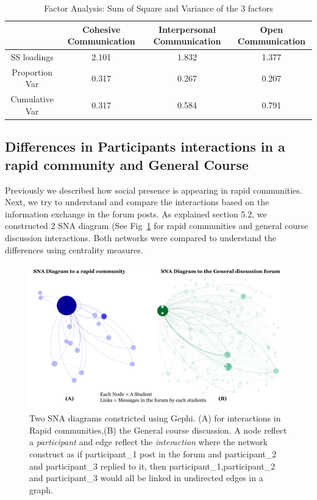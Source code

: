 \documentclass[manuscript,screen,review]{acmart}
\begin{document}
\begin{table}[h!]
\caption{Factor Analysis: Sum of Square and Variance of the 3 factors }
\label{tab:FA}
\centering
    \begin{tabular}{c|c|c|c}
    \toprule
     & Cohesive Communication & Interpersonal Communication & Open Communication  \\
     \midrule
     SS loadings &  2.101 &  1.832 &  1.377 \\
    Proportion Var &  0.317 &  0.267  &  0.207 \\
    Cumulative Var &  0.317 &  0.584  & 0.791 \\
    \bottomrule
    \end{tabular}
    \end{table}



\subsection{Differences in Participants interactions in a rapid community and General Course}

Previously we described how social presence is appearing in rapid communities. Next, we try to understand and compare the interactions based on the information exchange in the forum posts. As explained section 5.2, we constructed 2 SNA diagram (See Fig~\ref{fig:SNA} for rapid communities and general course discussion interactions. Both networks were compared to understand the differences using centrality measures.   

\begin{figure}[h]
  \centering
  \includegraphics[width=\linewidth]{images/SNA Diagrams.png}
  \caption{Two SNA diagrams constricted using Gephi. (A) for interactions in Rapid communities,(B) the General course discussion.  A node reflect a \textit{participant} and edge reflect the \textit{interaction} where the network construct as if participant\_1 post in the forum and participant\_2 and participant\_3 replied to it, then participant\_1,participant\_2 and participant\_3 would all be linked in undirected edges in a graph.}
 \label{fig:SNA}
\end{figure}
\end{document}
